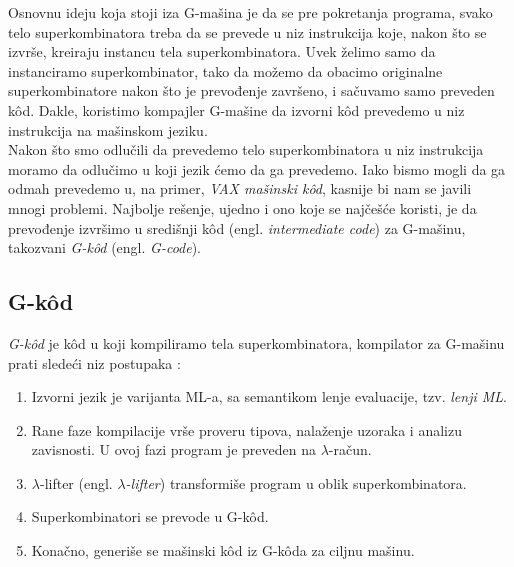 Osnovnu ideju koja stoji iza G-mašina je da se pre pokretanja programa, svako telo superkombinatora treba da se prevede u niz instrukcija koje, nakon što se izvrše, kreiraju instancu tela superkombinatora. Uvek želimo samo da instanciramo superkombinator, tako da možemo da obacimo originalne superkombinatore nakon što je prevođenje završeno, i sačuvamo samo preveden k\^od. Dakle, koristimo kompajler G-mašine da izvorni k\^od prevedemo u niz instrukcija na mašinskom jeziku. \\

Nakon što smo odlučili da prevedemo telo superkombinatora u niz instrukcija moramo da odlučimo u koji jezik ćemo da ga prevedemo. Iako bismo mogli da ga odmah prevedemo u, na primer, {\em VAX mašinski k\^od}, kasnije bi nam se javili mnogi problemi.
Najbolje rešenje, ujedno i ono koje se najčešće koristi, je da prevođenje izvršimo u središnji k\^od (engl. \textit{intermediate code}) za G-mašinu, takozvani {\em G-k\^od} (engl. \textit{G-code}). \\

\subsection{G-k\^od}

{\em G-k\^od} je k\^od u koji kompiliramo tela superkombinatora, kompilator za G-mašinu prati sledeći niz postupaka \cite{the-implementation-of-functional-programming-languages, abstract-machines}:
\begin{enumerate}
\item Izvorni jezik je varijanta ML-a, sa semantikom lenje evaluacije, tzv. {\em lenji ML}.
\item Rane faze kompilacije vrše proveru tipova, nalaženje uzoraka i analizu zavisnosti. U ovoj fazi program je preveden na $\lambda$-račun.
\item $\lambda$-lifter (engl. \textit{$\lambda$-lifter}) transformiše program u oblik superkombinatora.   
\item Superkombinatori se prevode u G-k\^od.
\item Konačno, generiše se mašinski k\^od iz G-k\^oda za ciljnu mašinu.
\end{enumerate}

